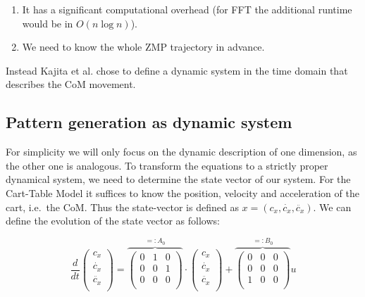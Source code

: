 \documentclass[english,ngerman]{KITreprt}
\begin{document}
\begin{enumerate}
\def\labelenumi{\arabic{enumi}.}
\item
  It has a significant computational overhead (for FFT the additional
  runtime would be in $O(n \log n)$).
\item
  We need to know the whole ZMP trajectory in advance.
\end{enumerate}

Instead Kajita et al. chose to define a dynamic system in the time
domain that describes the CoM movement.

\subsection{Pattern generation as dynamic
system}\label{pattern-generation-as-dynamic-system}

For simplicity we will only focus on the dynamic description of one
dimension, as the other one is analogous. To transform the equations to
a strictly proper dynamical system, we need to determine the state
vector of our system. For the Cart-Table Model it suffices to know the
position, velocity and acceleration of the cart, i.e.~the CoM. Thus the
state-vector is defined as $x = (c_x, \dot{c_x}, \ddot{c_x})$. We can
define the evolution of the state vector as follows:

\begin{equation} \label{eq:dyn-system}
\frac{d}{dt} \left(\begin{array}{c}
c_x \\
\dot{c_x} \\
\ddot{c_x} \\
\end{array} \right)
=
\overbrace{
\left(\begin{array}{ccc}
0 & 1 & 0\\
0 & 0 & 1 \\
0 & 0 & 0 \\
\end{array}\right)
}^{ =: A_0}
\cdot
\left(\begin{array}{c}
c_x \\
\dot{c_x} \\
\ddot{c_x} \\
\end{array}\right)
+
\overbrace{
\left(\begin{array}{ccc}
0 & 0 & 0\\
0 & 0 & 0\\
1 & 0 & 0\\
\end{array}\right)
}^{ =: B_0}
u
\end{equation}
\end{document}
